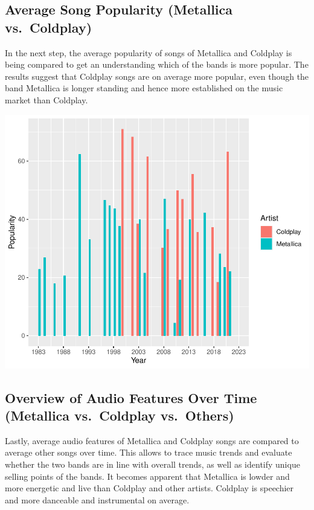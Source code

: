 \documentclass[11pt,preprint]{elsarticle}
\numberwithin{equation}{section}
\numberwithin{figure}{section}
\numberwithin{table}{section}
\begin{document}
\subsection{Average Song Popularity (Metallica
vs.~Coldplay)}\label{average-song-popularity-metallica-vs.-coldplay}

In the next step, the average popularity of songs of Metallica and
Coldplay is being compared to get an understanding which of the bands is
more popular. The results suggest that Coldplay songs are on average
more popular, even though the band Metallica is longer standing and
hence more established on the music market than Coldplay.

\includegraphics{Task_2_files/figure-latex/unnamed-chunk-7-1.pdf}

\subsection{Overview of Audio Features Over Time (Metallica vs.~Coldplay
vs.~Others)}\label{overview-of-audio-features-over-time-metallica-vs.-coldplay-vs.-others}

Lastly, average audio features of Metallica and Coldplay songs are
compared to average other songs over time. This allows to trace music
trends and evaluate whether the two bands are in line with overall
trends, as well as identify unique selling points of the bands. It
becomes apparent that Metallica is lowder and more energetic and live
than Coldplay and other artists. Coldplay is speechier and more
danceable and instrumental on average.
\end{document}
